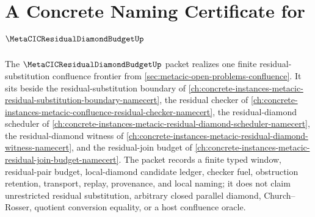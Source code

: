 \chapter{A Concrete Naming Certificate for $\MetaCICResidualDiamondBudgetUp$}
\label{ch:concrete-instances-metacic-residual-diamond-budget-namecert}

The $\MetaCICResidualDiamondBudgetUp$ packet realizes one finite residual-substitution confluence frontier from \autoref{sec:metacic-open-problems-confluence}. It sits beside the residual-substitution boundary of \autoref{ch:concrete-instances-metacic-residual-substitution-boundary-namecert}, the residual checker of \autoref{ch:concrete-instances-metacic-confluence-residual-checker-namecert}, the residual-diamond scheduler of \autoref{ch:concrete-instances-metacic-residual-diamond-scheduler-namecert}, the residual-diamond witness of \autoref{ch:concrete-instances-metacic-residual-diamond-witness-namecert}, and the residual-join budget of \autoref{ch:concrete-instances-metacic-residual-join-budget-namecert}. The packet records a finite typed window, residual-pair budget, local-diamond candidate ledger, checker fuel, obstruction retention, transport, replay, provenance, and local naming; it does not claim unrestricted residual substitution, arbitrary closed parallel diamond, Church--Rosser, quotient conversion equality, or a host confluence oracle.

